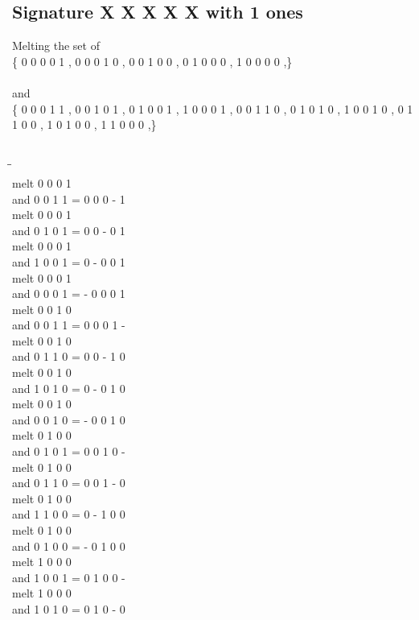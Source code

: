 \documentclass{article}
\begin{document}
\subsection{Signature X X X X X with 1 ones}
Melting the set of\\
\{ 0  0  0  0  1 , 0  0  0  1  0 , 0  0  1  0  0 , 0  1  0  0  0 , 1  0  0  0  0 ,\}\\\\
and\\
\{ 0  0  0  1  1 , 0  0  1  0  1 , 0  1  0  0  1 , 1  0  0  0  1 , 0  0  1  1  0 , 0  1  0  1  0 , 1  0  0  1  0 , 0  1  1  0  0 , 1  0  1  0  0 , 1  1  0  0  0 ,\}\\\\
\begin{tabbing}
\hspace{3cm}\=\hspace{3cm}\=\hspace{3cm}\\[1cm]
melt  0  0  0  1 \\
and  0  0  1  1 \>
 =  0  0  0  -  1 \\[1mm]
melt  0  0  0  1 \\
and  0  1  0  1 \>
 =  0  0  -  0  1 \\[1mm]
melt  0  0  0  1 \\
and  1  0  0  1 \>
 =  0  -  0  0  1 \\[1mm]
melt  0  0  0  1 \\
and  0  0  0  1 \>
 =  -  0  0  0  1 \\[1mm]
melt  0  0  1  0 \\
and  0  0  1  1 \>
 =  0  0  0  1  - \\[1mm]
melt  0  0  1  0 \\
and  0  1  1  0 \>
 =  0  0  -  1  0 \\[1mm]
melt  0  0  1  0 \\
and  1  0  1  0 \>
 =  0  -  0  1  0 \\[1mm]
melt  0  0  1  0 \\
and  0  0  1  0 \>
 =  -  0  0  1  0 \\[1mm]
melt  0  1  0  0 \\
and  0  1  0  1 \>
 =  0  0  1  0  - \\[1mm]
melt  0  1  0  0 \\
and  0  1  1  0 \>
 =  0  0  1  -  0 \\[1mm]
melt  0  1  0  0 \\
and  1  1  0  0 \>
 =  0  -  1  0  0 \\[1mm]
melt  0  1  0  0 \\
and  0  1  0  0 \>
 =  -  0  1  0  0 \\[1mm]
melt  1  0  0  0 \\
and  1  0  0  1 \>
 =  0  1  0  0  - \\[1mm]
melt  1  0  0  0 \\
and  1  0  1  0 \>
 =  0  1  0  -  0 \\[1mm]
\end{tabbing}
\end{document}
